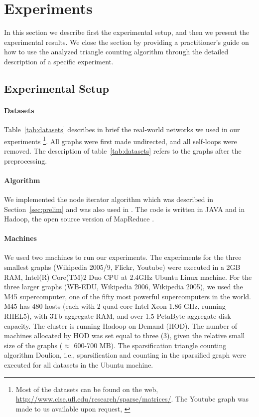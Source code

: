 \documentclass{llncs}
\begin{document}
\section{Experiments}
\label{sec:experiments}

In this section we describe first the experimental setup, and then we present the experimental results. 
We close the section by providing a practitioner's guide on how to use the analyzed triangle counting
algorithm through the detailed description of a specific experiment.


\subsection{Experimental Setup}

\paragraph{Datasets}
Table~\ref{tab:datasets} describes in brief the real-world networks we used in our experiments \footnote{Most of the datasets
can be found on the web, \url{http://www.cise.ufl.edu/research/sparse/matrices/}. The Youtube graph was made to us available 
upon request, \cite{mislove}}.
All graphs were first made undirected, and all self-loops were removed. The description 
of table~\ref{tab:datasets} refers to the graphs after the preprocessing. 

\paragraph{Algorithm}
We implemented the node iterator algorithm which was described in Section~\ref{sec:prelim} and was also used in \cite{Tsourakakiskdd09}. 
The code is written in JAVA and in Hadoop, the open source version of MapReduce \cite{dean}.

\paragraph{Machines}
We used two machines to run our experiments. The experiments for the three smallest graphs (Wikipedia 2005/9, 
Flickr, Youtube) were executed in a  2GB RAM, Intel(R) Core(TM)2 Duo CPU at 2.4GHz Ubuntu Linux machine.
For the three larger graphs (WB-EDU, Wikipedia 2006, Wikipedia 2005), we used the M45 supercomputer,
one of the fifty most powerful supercomputers in the world.
M45 has 480 hosts (each with  2 quad-core Intel Xeon 1.86 GHz, running
RHEL5),
with 3Tb aggregate RAM, and over 1.5 PetaByte aggregate disk capacity.
The cluster is running Hadoop on Demand (HOD). The number of machines allocated by HOD was set equal to three (3), 
given the relative small size of the graphs ($\approx$ 600-700 MB).
The sparsification triangle counting algorithm Doulion, i.e., sparsification and counting in the sparsified graph
were executed for all datasets in the Ubuntu machine. 
 
\end{document}
